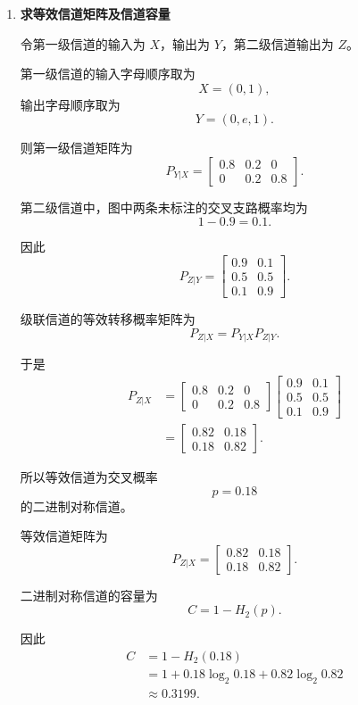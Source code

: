 \documentclass[UTF8,a4paper,12pt]{ctexart}
\begin{document}
\begin{enumerate}[label=\arabic*., leftmargin=2.2em]
\item \textbf{求等效信道矩阵及信道容量}

令第一级信道的输入为 $X$，输出为 $Y$，第二级信道输出为 $Z$。

第一级信道的输入字母顺序取为
\[
X=(0,1),
\]
输出字母顺序取为
\[
Y=(0,e,1).
\]

则第一级信道矩阵为
\[
P_{Y|X}
=
\begin{bmatrix}
0.8&0.2&0\\
0&0.2&0.8
\end{bmatrix}.
\]

第二级信道中，图中两条未标注的交叉支路概率均为
\[
1-0.9=0.1.
\]

因此
\[
P_{Z|Y}
=
\begin{bmatrix}
0.9&0.1\\
0.5&0.5\\
0.1&0.9
\end{bmatrix}.
\]

级联信道的等效转移概率矩阵为
\[
P_{Z|X}
=
P_{Y|X}P_{Z|Y}.
\]

于是
\[
\begin{aligned}
P_{Z|X}
&=
\begin{bmatrix}
0.8&0.2&0\\
0&0.2&0.8
\end{bmatrix}
\begin{bmatrix}
0.9&0.1\\
0.5&0.5\\
0.1&0.9
\end{bmatrix}\\
&=
\begin{bmatrix}
0.82&0.18\\
0.18&0.82
\end{bmatrix}.
\end{aligned}
\]

所以等效信道为交叉概率
\[
p=0.18
\]
的二进制对称信道。

等效信道矩阵为
\[
\boxed{
P_{Z|X}
=
\begin{bmatrix}
0.82&0.18\\
0.18&0.82
\end{bmatrix}
}.
\]

二进制对称信道的容量为
\[
C=1-H_2(p).
\]

因此
\[
\begin{aligned}
C
&=
1-H_2(0.18)\\
&=
1+0.18\log_2 0.18
+0.82\log_2 0.82\\
&\approx0.3199.
\end{aligned}
\]


\end{enumerate}
\end{document}
